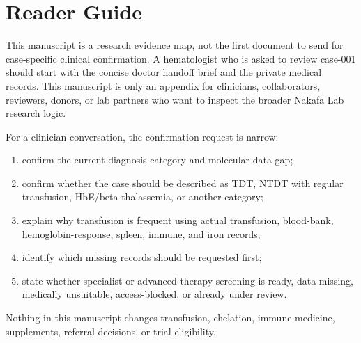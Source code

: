 \section*{Reader Guide}

This manuscript is a research evidence map, not the first document to send for
case-specific clinical confirmation. A hematologist who is asked to review
case-001 should start with the concise doctor handoff brief and the private
medical records. This manuscript is only an appendix for clinicians,
collaborators, reviewers, donors, or lab partners who want to inspect the
broader Nakafa Lab research logic.

For a clinician conversation, the confirmation request is narrow:

\begin{enumerate}[leftmargin=*]
  \item confirm the current diagnosis category and molecular-data gap;
  \item confirm whether the case should be described as TDT, NTDT with regular
  transfusion, HbE/beta-thalassemia, or another category;
  \item explain why transfusion is frequent using actual transfusion, blood-bank,
  hemoglobin-response, spleen, immune, and iron records;
  \item identify which missing records should be requested first;
  \item state whether specialist or advanced-therapy screening is ready,
  data-missing, medically unsuitable, access-blocked, or already under review.
\end{enumerate}

Nothing in this manuscript changes transfusion, chelation, immune medicine,
supplements, referral decisions, or trial eligibility.
